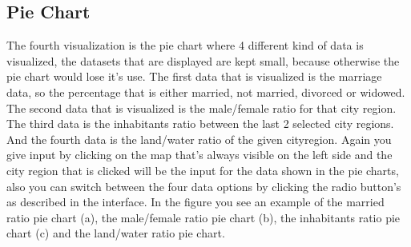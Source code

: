 \documentclass[a4paper,twoside,11pt]{article}
\begin{document}
\subsection{Pie Chart}
The fourth visualization is the pie chart where 4 different kind of data is visualized, the datasets that are displayed are kept small, because otherwise the pie chart would lose it's use. The first data that is visualized is the marriage data, so the percentage that is either married, not married, divorced or widowed. The second data that is visualized is the male/female ratio for that city region. The third data is the inhabitants ratio between the last 2 selected city regions. And the fourth data is the land/water ratio of the given cityregion. \newline
Again you give input by clicking on the map that's always visible on the left side and the city region that is clicked will be the input for the data shown in the pie charts, also you can switch between the four data options by clicking the radio button's as described in the interface. In the figure you see an example of the married ratio pie chart (a), the male/female ratio pie chart (b), the inhabitants ratio pie chart (c) and the land/water ratio pie chart.
\end{document}
